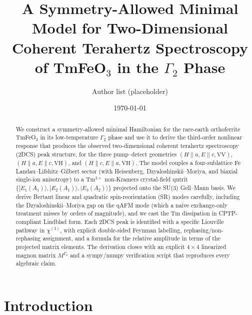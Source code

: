 \documentclass[reprint,amsmath,amssymb,aps,prb,longbibliography]{revtex4-2}
\begin{document}
\title{A Symmetry-Allowed Minimal Model for Two-Dimensional Coherent Terahertz Spectroscopy of TmFeO\texorpdfstring{$_3$}{3} in the \texorpdfstring{$\Gamma_2$}{Gamma2} Phase}

\author{Author list (placeholder)}
\date{\today}

\begin{abstract}
We construct a symmetry-allowed minimal Hamiltonian for the rare-earth
orthoferrite TmFeO$_3$ in its low-temperature $\Gamma_2$ phase and use it to
derive the third-order nonlinear response that produces the observed
two-dimensional coherent terahertz spectroscopy (2DCS) peak structure,
for the
three pump--detect geometries
$(H\!\parallel\! a, E\!\parallel\! c,\mathrm{VV})$,
$(H\!\parallel\! a, E\!\parallel\! c,\mathrm{VH})$, and
$(H\!\parallel\! c, E\!\parallel\! a,\mathrm{VH})$. The model couples a
four-sublattice Fe Landau--Lifshitz--Gilbert sector (with Heisenberg,
Dzyaloshinskii--Moriya, and biaxial single-ion anisotropy) to a Tm$^{3+}$
non-Kramers crystal-field qutrit
$\{|E_1(A_1)\rangle,|E_2(A_1)\rangle,|E_3(A_2)\rangle\}$ projected onto the
SU(3) Gell--Mann basis. We derive Bertaut linear and quadratic
spin-reorientation (SR) modes carefully, including the
Dzyaloshinskii--Moriya gap on the qAFM mode (which a naive
exchange-only treatment misses by orders of magnitude), and we cast the
Tm dissipation in CPTP-compliant Lindblad form. Each 2DCS peak is
identified with a specific Liouville pathway in $\chi^{(3)}$, with explicit
double-sided Feynman labelling, rephasing/non-rephasing assignment, and a
formula for the relative amplitude in terms of the projected matrix
elements. The derivation closes with an explicit $4\times 4$ linearized
magnon matrix $M^{\Gamma_2}$ and a sympy/numpy verification script that
reproduces every algebraic claim.
\end{abstract}

\maketitle

\tableofcontents

\section{Introduction}
\label{sec:intro}
\end{document}
